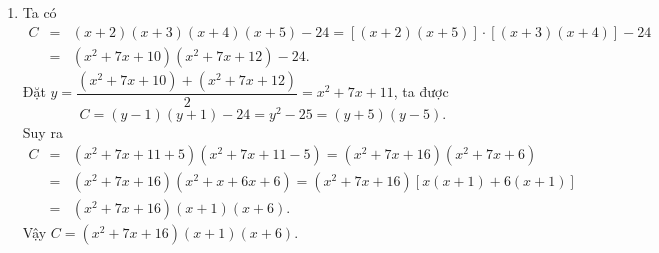 \begin{vn}
{\begin{enumerate}
{\begin{eqnarray*}
& =&\left( x^2+6x-7 \right) \left( x^2+6x-16 \right) +8.
\end{eqnarray*}
}
Đặt $y=\dfrac{\left( x^2+6x-7 \right)+\left(x^2+6x-16 \right)}{2}=x^2+6x-\dfrac{23}{2}$, ta được
\[N=\left( y+\dfrac{9}{2} \right) \left( y-\dfrac{9}{2}  \right) +8=y^2-\dfrac{49}{4}=\left( y+\dfrac{7}{2} \right) \left(y-\dfrac{7}{2}\right).\]
Suy ra 
{\allowdisplaybreaks
\begin{eqnarray*}
D&=&\left( x^2+6x-\dfrac{23}{2}+\dfrac{7}{2} \right) \left( x^2+6x-\dfrac{23}{2}-\dfrac{7}{2} \right) =\left( x^2+7x-8 \right) \left( x^2+7x-15 \right)\\
&=&\left( x^2-x+8x-8 \right) \left( x^2+7x-15 \right) = \left[ x(x-1)+8(x-1) \right] \left( x^2+7x-15 \right)\\
&=& (x-1)(x+8)\left( x^2+7x-15 \right) .
\end{eqnarray*}
}
Vậy $N=(x-1)(x+8)\left( x^2+7x-15 \right)$.
\item 
Ta có 
{\allowdisplaybreaks
	\begin{eqnarray*}
		C&=&(x+2)(x+3)(x+4)(x+5)-24=[(x+2)(x+5)]\cdot [(x+3)(x+4)]-24\\
		& =&\left( x^2+7x+10\right) \left( x^2+7x+12\right) -24.
	\end{eqnarray*}
}
Đặt $y=\dfrac{\left( x^2+7x+10 \right)+\left(x^2+7x+12 \right)}{2}=x^2+7x+11$, ta được
\[C=(y-1)(y+1)-24=y^2-25=(y+5)(y-5).\]
Suy ra 
{\allowdisplaybreaks
	\begin{eqnarray*}
		C&=&\left( x^2+7x+11+5 \right) \left( x^2+7x+11-5 \right) =\left( x^2+7x+16 \right) \left( x^2+7x+6 \right)\\
		&=&\left( x^2+7x+16 \right)\left( x^2+x+6x+6 \right) = \left( x^2+7x+16 \right)\left[ x(x+1)+6(x+1) \right] \\
		&=& \left( x^2+7x+16 \right)(x+1)(x+6).
	\end{eqnarray*}}Vậy $C=\left( x^2+7x+16 \right)(x+1)(x+6)$.
\end{enumerate} 
}
\end{vn}

